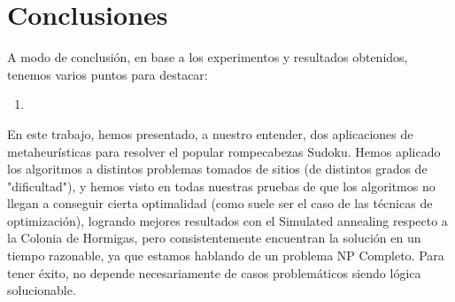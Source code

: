 \section{Conclusiones}
A modo de conclusión, en base a los experimentos y resultados obtenidos, tenemos varios puntos para destacar:\\
\begin{enumerate}
  \item 
\end{enumerate}

En este trabajo, hemos presentado, a nuestro entender, dos aplicaciones de metaheurísticas para resolver el  popular rompecabezas Sudoku. Hemos aplicado los algoritmos a distintos problemas tomados de sitios (de distintos grados de "dificultad"), y hemos visto en todas nuestras pruebas de que los algoritmos no llegan a conseguir cierta optimalidad (como suele ser el caso de las técnicas de optimización), logrando mejores resultados con el Simulated annealing respecto a la Colonia de Hormigas, pero consistentemente encuentran la solución en un tiempo razonable, ya que estamos hablando de un problema NP Completo. Para tener éxito, no depende necesariamente de casos problemáticos siendo lógica solucionable.
